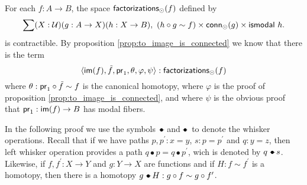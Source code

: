 \begin{thm}
For each $f:A\to B$, the space $\mathsf{factorizations}_{\odot}(f)$ defined by
\begin{equation*}
\sum(X:\type)(g:A\to X)(h:X\to B),\ (h\circ g\sim f)\times\mathsf{conn}_\modal(g)\times\ismodal\ h.
\end{equation*}
is contractible. By proposition \ref{prop:to_image_is_connected} we know that there is the term
\begin{equation*}
{\langle \ensuremath{\mathsf{im}}(f),\tilde{f},\ensuremath{\mathsf{pr}_{1}},\theta,\varphi,\psi\rangle}:\mathsf{factorizations}_{\odot}(f)
\end{equation*}
where $\theta:\mathsf{pr}_{1}\circ\tilde{f}\sim f$ is the canonical homotopy, where $\varphi$ is the proof of proposition
\ref{prop:to_image_is_connected}, and where $\psi$ is the obvious proof that $\mathsf{pr}_{1}:\mathsf{im}(f)\to B$ has modal fibers.
\end{thm}

In the following proof we use the symbols $\mathbin{-\!\!\!\!\bullet}$ and $\mathbin{\bullet\!\!\!\!-}$ to denote the whisker operations. Recall that if we have paths
$p,p^\prime:x= y$, $s:p= p^\prime$ and $q:y= z$, then left whisker operation provides a path $q\bullet p=
q\bullet p^\prime$, wich is denoted by $q\mathbin{-\!\!\!\!\bullet} s$. Likewise, if $f,f^\prime:X\to Y$ and $g:Y\to X$ are functions and if $H:f\sim
f^\prime$ is a homotopy, then there is a homotopy $g\mathbin{-\!\!\!\!\bullet} H:g\circ f\sim g\circ f^\prime$.

